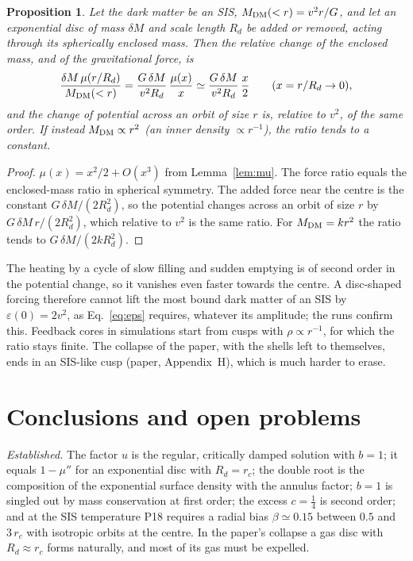 \documentclass[11pt,a4paper]{article}
\newtheorem{proposition}{Proposition}
\theoremstyle{definition}
\theoremstyle{remark}
\newcommand{\rc}{r_c}
\newcommand{\Rd}{R_d}
\begin{document}
\begin{proposition}\label{prop:shield}
Let the dark matter be an SIS, $M_{\rm DM}(<r)=v^2r/G$, and let an exponential disc of mass
$\delta M$ and scale length $\Rd$ be added or removed, acting through its spherically
enclosed mass. Then the relative change of the enclosed mass, and of the gravitational force,
is
\begin{equation}
  \frac{\delta M\,\mu(r/\Rd)}{M_{\rm DM}(<r)}=\frac{G\,\delta M}{v^2\Rd}\,\frac{\mu(x)}{x}
  \simeq\frac{G\,\delta M}{v^2\Rd}\,\frac{x}{2}\qquad(x=r/\Rd\to0),
\end{equation}
and the change of potential across an orbit of size $r$ is, relative to $v^2$, of the same
order. If instead $M_{\rm DM}\propto r^2$ (an inner density $\propto r^{-1}$), the ratio tends
to a constant.
\end{proposition}
\begin{proof}
$\mu(x)=x^2/2+O(x^3)$ from Lemma~\ref{lem:mu}. The force ratio equals the enclosed-mass ratio
in spherical symmetry. The added force near the centre is the constant
$G\,\delta M/(2\Rd^2)$, so the potential changes across an orbit of size $r$ by
$G\,\delta M\,r/(2\Rd^2)$, which relative to $v^2$ is the same ratio. For
$M_{\rm DM}=kr^2$ the ratio tends to $G\,\delta M/(2k\Rd^2)$.
\end{proof}

The heating by a cycle of slow filling and sudden emptying is of second order in the potential
change, so it vanishes even faster towards the centre. A disc-shaped forcing therefore cannot
lift the most bound dark matter of an SIS by $\varepsilon(0)=2v^2$, as Eq.~\eqref{eq:eps}
requires, whatever its amplitude; the runs confirm this. Feedback cores in simulations start
from cusps with $\rho\propto r^{-1}$, for which the ratio stays finite. The collapse of the
paper, with the shells left to themselves, ends in an SIS-like cusp (paper, Appendix~H), which
is much harder to erase.

\section{Conclusions and open problems}\label{sec:conc}

\emph{Established.} The factor $u$ is the regular, critically damped solution with $b=1$; it
equals $1-\mu''$ for an exponential disc with $\Rd=\rc$; the double root is the composition of
the exponential surface density with the annulus factor; $b=1$ is singled out by mass
conservation at first order; the excess $c=\tfrac14$ is second order; and at the SIS temperature
P18 requires a radial bias $\beta\simeq0.15$ between $0.5$ and $3\,\rc$ with isotropic orbits at
the centre. In the paper's collapse a gas disc with $\Rd\approx\rc$ forms naturally, and most of
its gas must be expelled.
\end{document}
